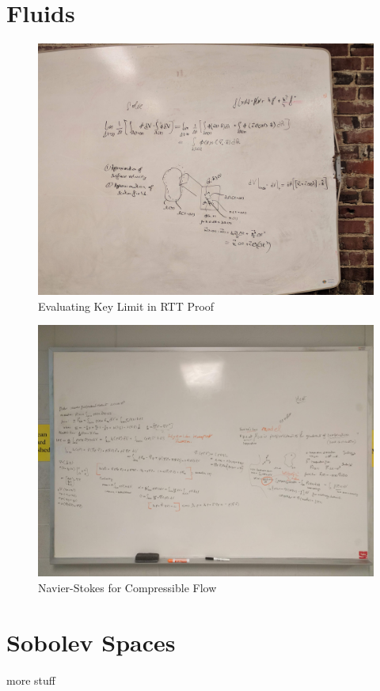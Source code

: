 \appendix

\chapter{Fluids}
\begin{figure}[h!]
    \centering
    \includegraphics[width=1.0\textwidth]{fig/RTT.jpg}
    \caption{Evaluating Key Limit in RTT Proof}
    \label{fig:rtt}
\end{figure}

\begin{figure}[h!]
    \centering
    \includegraphics[width=1.0\textwidth]{fig/NS.jpg}
    \caption{Navier-Stokes for Compressible Flow}
    \label{fig:ns}
\end{figure}

\chapter{Sobolev Spaces}
more stuff